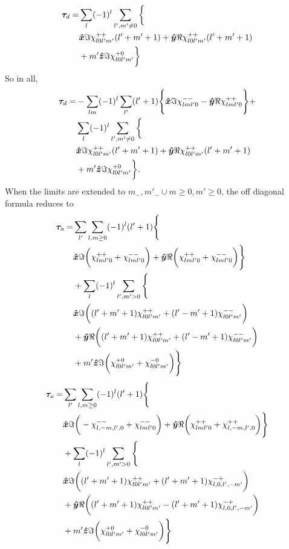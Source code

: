 \documentclass[aps,twocolumn,secnumarabic,balancelastpage,amsmath,amssymb,nofootinbib,floatfix]{revtex4-1}
\begin{document}
\begin{equation*}
\begin{aligned}
\bm \tau_d = &\sum_{l}(-1)^l\sum_{l',m'\neq 0}\bigg\{ \\
&\bm{\hat x}\Im\chi_{l0l'm'}^{++}(l'+m'+1)+\bm{\hat y}\Re\chi_{l0l'm'}^{++}(l'+m'+1)\\
&+m'\bm{\hat z} \Im\chi_{l0l'm'}^{+0}\bigg\}
\end{aligned}
\end{equation*}
So in all,
\begin{equation*}
\begin{aligned}
\bm \tau_d = &-\sum_{lm}(-1)^l\sum_{l'}(l'+1)\Bigg\{\bm{\hat x}\Im\chi_{lml'0}^{--} - \bm{\hat y}\Re\chi_{lml'0}^{++}\Bigg\}+\\
 &\sum_{l}(-1)^l\sum_{l',m'\neq 0}\bigg\{ \\
&\bm{\hat x}\Im\chi_{l0l'm'}^{++}(l'+m'+1)+\bm{\hat y}\Re\chi_{l0l'm'}^{++}(l'+m'+1)\\
&+m'\bm{\hat z} \Im\chi_{l0l'm'}^{+0}\bigg\}.
\end{aligned}
\end{equation*}
When the limits are extended to $m_-,m'_- \cup m\geq 0, m' \geq 0$, the off diagonal formula reduces to
\begin{equation*}
\begin{aligned}
\bm \tau_o = &\sum_{l'}\sum_{l,m\geq0}(-1)^l(l'+1)\Bigg\{\\
&\bm{\hat x} \Im\bigg(\chi_{lml'0}^{++} + \chi_{lml'0}^{--}\bigg)+\bm{\hat y} \Re\bigg(\chi_{lml'0}^{++} + \chi_{lml'0}^{--}\bigg)\Bigg\}\\
&+\sum_{l}(-1)^l\sum_{l',m'>0}\Bigg\{\\
&\bm{\hat x} \Im\bigg((l'+m'+1)\chi_{l0l'm'}^{++} + (l'-m'+1)\chi_{l0l'm'}^{--}\bigg)\\
&+\bm{\hat y} \Re\bigg((l'+m'+1)\chi_{l0l'm'}^{++} + (l'-m'+1)\chi_{l0l'm'}^{--}\bigg)\\
&+m'\bm{\hat z}\Im\bigg(\chi_{l0l'm'}^{+0}+\chi_{l0l'm'}^{-0}\bigg)\Bigg\}
\end{aligned}
\end{equation*}
\begin{equation*}
\begin{aligned}
\bm \tau_o = &\sum_{l'}\sum_{l,m\geq0}(-1)^l(l'+1)\Bigg\{\\
&\bm{\hat x} \Im\bigg(-\chi_{l,-m,l',0}^{--} + \chi_{lml'0}^{--}\bigg)+\bm{\hat y} \Re\bigg(\chi_{lml'0}^{++} + \chi_{l,-m,l',0}^{++}\bigg)\Bigg\}\\
&+\sum_{l}(-1)^l\sum_{l',m'>0}\Bigg\{\\
&\bm{\hat x} \Im\bigg((l'+m'+1)\chi_{l0l'm'}^{++} + (l'+m'+1)\chi_{l,0,l',-m'}^{-+}\bigg)\\
&+\bm{\hat y} \Re\bigg((l'+m'+1)\chi_{l0l'm'}^{++} - (l'+m'+1)\chi_{l,0,l',-m'}^{-+}\bigg)\\
&+m'\bm{\hat z}\Im\bigg(\chi_{l0l'm'}^{+0}+\chi_{l0l'm'}^{-0}\bigg)\Bigg\}
\end{aligned}
\end{equation*}
\end{document}
